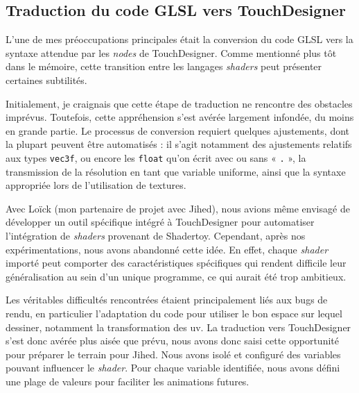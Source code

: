 \subsection*{Traduction du code GLSL vers TouchDesigner}
L'une de mes préoccupations principales était la conversion du code GLSL vers la syntaxe attendue par les \textit{nodes} de TouchDesigner. Comme mentionné plus tôt dans le mémoire, cette transition entre les langages \textit{shaders} peut présenter certaines subtilités.

Initialement, je craignais que cette étape de traduction ne rencontre des obstacles imprévus. Toutefois, cette appréhension s'est avérée largement infondée, du moins en grande partie. Le processus de conversion requiert quelques ajustements, dont la plupart peuvent être automatisés : il s'agit notamment des ajustements relatifs aux types \lstinline{vec3f}, ou encore les \lstinline{float} qu'on écrit avec ou sans « \lstinline{.} », la transmission de la résolution en tant que variable uniforme, ainsi que la syntaxe appropriée lors de l'utilisation de textures.

Avec Loïck (mon partenaire de projet avec Jihed), nous avions même envisagé de développer un outil spécifique intégré à TouchDesigner pour automatiser l'intégration de \textit{shaders} provenant de Shadertoy. Cependant, après nos expérimentations, nous avons abandonné cette idée. En effet, chaque \textit{shader} importé peut comporter des caractéristiques spécifiques qui rendent difficile leur généralisation au sein d'un unique programme, ce qui aurait été trop ambitieux.

Les véritables difficultés rencontrées étaient principalement liés aux bugs de rendu, en particulier l'adaptation du code pour utiliser le bon espace sur lequel dessiner, notamment la transformation des uv. La traduction vers TouchDesigner s'est donc avérée plus aisée que prévu, nous avons donc saisi cette opportunité pour préparer le terrain pour Jihed. Nous avons isolé et configuré des variables pouvant influencer le \textit{shader}. Pour chaque variable identifiée, nous avons défini une plage de valeurs pour faciliter les animations futures.


